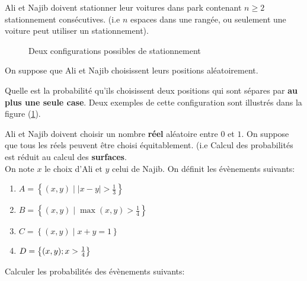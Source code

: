 \documentclass[11pt,largemargins]{homework}
\begin{document}
\maketitle
Ali et Najib doivent stationner leur voitures dans park contenant $n\geq 2$
stationnement consécutives. (i.e $n$ espaces dans une rangée, ou seulement une
voiture peut utiliser un stationnement).


\begin{figure}[htpb]
\begin{center}
\end{center}
\caption{Deux configurations possibles de stationnement}%
\label{fig:stationement}
\end{figure}
On suppose que Ali et Najib choisissent leurs positions aléatoirement.

\begin{arabicparts}
    \item Quelle est la probabilité qu'ils choisissent deux positions qui sont
        sépares par  \textbf{au plus une seule case}. Deux exemples de cette
        configuration sont
        illustrés dans la figure (\ref{fig:stationement}).
\end{arabicparts}

Ali et Najib doivent choisir un nombre \textbf{réel} aléatoire entre $0$ et $1$.
On suppose que tous les réels peuvent être choisi équitablement. (i.e Calcul des
probabilités est réduit au calcul des \textbf{surfaces}.\\[10pt]



On note $x$ le choix d'Ali et $y$ celui de Najib. On définit les évènements suivants:

\begin{enumerate}
    \item $A = \left\{ (x,y)\;|\; | x - y| > \frac{1}{3}\right\}$\\[8pt]
    \item $B = \left\{ (x,y)\;|\;\max(x,y) > \frac{1}{4}\right\}$\\[8pt]
    \item $C =\left\{ (x,y)\;|\; x + y = 1 \right\}$\\[8pt]
    \item $D =\left\{(x,y)\;\\; x > \frac{1}{4}\right\}$ 
\end{enumerate}
Calculer les probabilités des évènements suivants:
\end{document}
